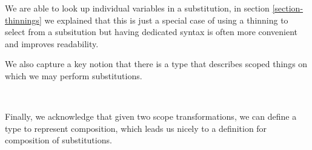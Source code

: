We are able to look up individual variables in a substitution, in section
\ref{section-thinnings} we explained that this is just a special case of
using a thinning to select from a subsitution but having dedicated syntax
is often more convenient and improves readability.

\begin{code}%
\>[0]\AgdaSpace{}%
\AgdaSymbol{:}\AgdaSpace{}%
\AgdaSymbol{(}\AgdaSpace{}%
\AgdaSymbol{:}\AgdaSpace{}%
\AgdaSymbol{)}\AgdaSpace{}%
\AgdaSpace{}%
\AgdaSpace{}%
\AgdaOperator{\AgdaFunction{⇒[}}\AgdaSpace{}%
\AgdaSpace{}%
\AgdaOperator{\AgdaFunction{]}}\AgdaSpace{}%
\AgdaSpace{}%
\AgdaSpace{}%
\AgdaSpace{}%
\AgdaSpace{}%
\AgdaSpace{}%
\AgdaSpace{}%
\<%
\end{code}

We also capture a key notion that there is a type that describes scoped
things on which we may perform substitutions.

\begin{code}%
\>[0]\AgdaSpace{}%
\AgdaSymbol{:}\AgdaSpace{}%
\AgdaSpace{}%
\AgdaSpace{}%
\<%
\\
\>[0]\AgdaSpace{}%
\AgdaSpace{}%
\AgdaSymbol{=}\AgdaSpace{}%
\AgdaSpace{}%
\AgdaSymbol{\{}\AgdaSymbol{\}}\AgdaSpace{}%
\AgdaSymbol{\{}\AgdaSymbol{\}}\AgdaSpace{}%
\AgdaSpace{}%
\AgdaSpace{}%
\AgdaSpace{}%
\AgdaSpace{}%
\AgdaSpace{}%
\AgdaOperator{\AgdaFunction{⇒[}}\AgdaSpace{}%
\AgdaSpace{}%
\AgdaOperator{\AgdaFunction{]}}\AgdaSpace{}%
\AgdaSpace{}%
\AgdaSpace{}%
\AgdaSpace{}%
\<%
\end{code}

Finally, we acknowledge that given two scope transformations, we can define
a type to represent composition, which leads us nicely to a definition for
composition of substitutions.

